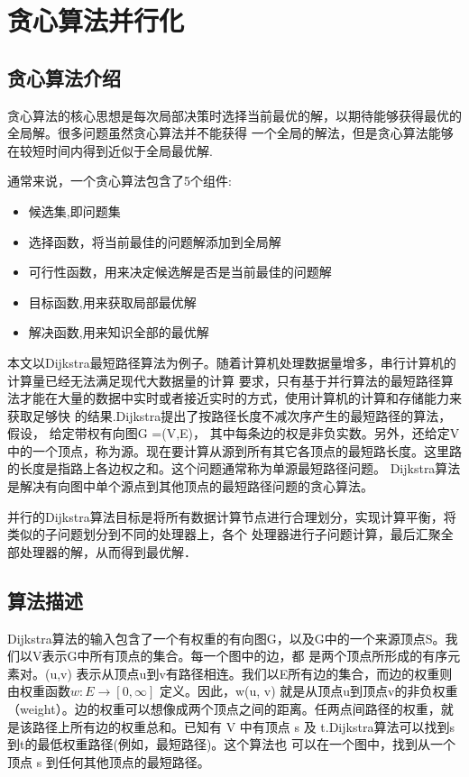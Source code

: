 
\chapter[贪心算法并行化]{贪心算法并行化}
\section{贪心算法介绍}
    贪心算法的核心思想是每次局部决策时选择当前最优的解，以期待能够获得最优的全局解。很多问题虽然贪心算法并不能获得
一个全局的解法，但是贪心算法能够在较短时间内得到近似于全局最优解. 

    通常来说，一个贪心算法包含了5个组件:

    \begin{itemize}
        \item 候选集,即问题集
        \item 选择函数，将当前最佳的问题解添加到全局解
        \item 可行性函数，用来决定候选解是否是当前最佳的问题解
        \item 目标函数,用来获取局部最优解
        \item 解决函数,用来知识全部的最优解
    \end{itemize}

    本文以Dijkstra最短路径算法为例子。随着计算机处理数据量增多，串行计算机的计算量已经无法满足现代大数据量的计算
要求，只有基于并行算法的最短路径算法才能在大量的数据中实时或者接近实时的方式，使用计算机的计算和存储能力来获取足够快
的结果.Dijkstra提出了按路径长度不减次序产生的最短路径的算法，假设， 给定带权有向图G =(V,E)，
其中每条边的权是非负实数。另外，还给定V中的一个顶点，称为源。现在要计算从源到所有其它各顶点的最短路长度。这里路的长度是指路上各边权之和。这个问题通常称为单源最短路径问题。
Dijkstra算法是解决有向图中单个源点到其他顶点的最短路径问题的贪心算法。

    并行的Dijkstra算法目标是将所有数据计算节点进行合理划分，实现计算平衡，将类似的子问题划分到不同的处理器上，各个
处理器进行子问题计算，最后汇聚全部处理器的解，从而得到最优解．

\section{算法描述}
    
    Dijkstra算法的输入包含了一个有权重的有向图G，以及G中的一个来源顶点S。我们以V表示G中所有顶点的集合。每一个图中的边，都
是两个顶点所形成的有序元素对。(u,v) 表示从顶点u到v有路径相连。我们以E所有边的集合，而边的权重则由权重函数$w: E \rightarrow [0, \infty]$
定义。因此，w(u, v) 就是从顶点u到顶点v的非负权重（weight）。边的权重可以想像成两个顶点之间的距离。任两点间路径的权重，就
是该路径上所有边的权重总和。已知有 V 中有顶点 s 及 t.Dijkstra算法可以找到s到t的最低权重路径(例如，最短路径)。这个算法也
可以在一个图中，找到从一个顶点 s 到任何其他顶点的最短路径。

